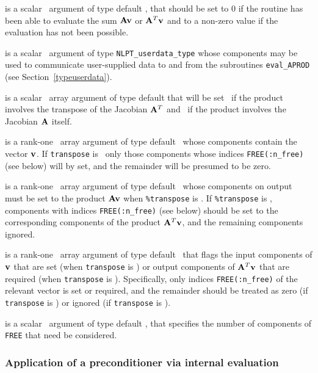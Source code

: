 \documentclass{galahad}
\begin{document}
\begin{description}
 is a scalar \intentout\ argument of type default \integer,
that should be set to 0 if the routine has been able to evaluate the
sum ${\mathbf{A}} {\mathbf{v}}$ or ${\mathbf{A}}^T{\mathbf{v}}$
and to a non-zero value if the evaluation has not been possible.

 is a scalar \intentinout\ argument of type
{\tt NLPT\_userdata\_type} whose components may be used
to communicate user-supplied data to and from the subroutines
{\tt eval\_APROD}
(see Section~\ref{typeuserdata}).

 is a scalar \intentin\ array argument of type
default that will be set \true\ if the product involves the transpose
of the Jacobian ${\mathbf{A}}^T$ and \false\ if the product involves
the Jacobian ${\mathbf{A}}$ itself.

 is a rank-one \intentin\ array argument of type default \realdp\
whose components contain the vector ${\mathbf{v}}$. If {\tt transpose} is \false\
only those components whose indices {\tt FREE(:n\_free)} (see below)
will by set, and the remainder will be presumed to be zero.

 is a rank-one \intentout\ array argument of type default \realdp\
whose components on output must be set to the
product ${\mathbf{A}} {\mathbf{v}}$ when {\tt \%transpose} is \false. If
{\tt \%transpose} is \true, components with indices {\tt FREE(:n\_free)}
(see below) should be set to the corresponding components of the
product ${\mathbf{A}}^T {\mathbf{v}}$, and the remaining components ignored.

\itt{FREE} is a rank-one \intentin\ array argument of
type default \integer\ that flags the input components of ${\mathbf{v}}$ that are set
(when {\tt transpose} is \false) or output components of ${\mathbf{A}}^T {\mathbf{v}}$ that
are required (when {\tt transpose} is \true). Specifically, only indices
{\tt FREE(:n\_free)} of the relevant vector is set or required, and the
remainder should be treated as zero (if {\tt transpose} is \false)
or ignored  (if {\tt transpose} is \true).

\itt{n\_free} is a scalar \intentin\ argument of type default \integer,
that specifies the number of components of {\tt FREE} that need be considered.

\end{description}


\subsubsection{Application of a preconditioner via internal evaluation
\label{prec}}
\end{document}
